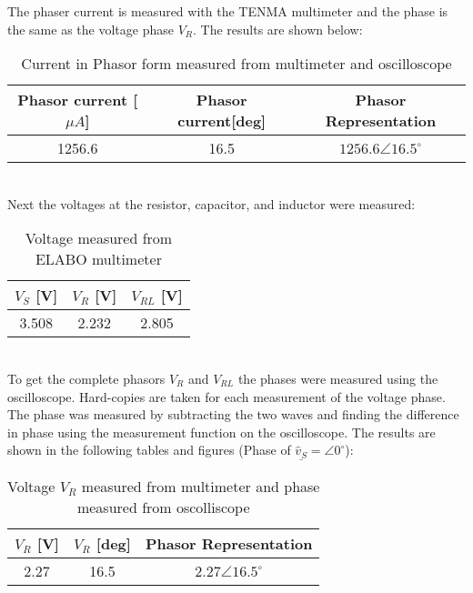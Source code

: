 \documentclass[12pt]{report}
\begin{document}
\FloatBarrier %
The phaser current is measured with the TENMA multimeter and the phase is the same as the voltage phase $V_R$. The results are shown below:
\begin{table}[ht]
\centering
\begin{minipage}{0.8\linewidth}
\centering
\begin{tabular}{|c|c|c|}
\hline
\rowcolor{lightblue} Phasor current [$\mu A$] & Phasor current[deg] & Phasor Representation \\
\hline
1256.6 & 16.5 & $ 1256.6 \angle 16.5^\circ $  \\
\hline
\end{tabular}
\caption{Current in Phasor form measured from multimeter and oscilloscope}
\label{tab:example}
\end{minipage}
\end{table}\\
Next the voltages at the resistor, capacitor, and inductor were measured: 
\begin{table}[ht]
\centering
\begin{minipage}{0.8\linewidth}
\centering
\begin{tabular}{|c|c|c|}
\hline
\rowcolor{lightblue} $V_S $ [V] & $V_R $ [V] & $V_{RL}$  [V]\\
\hline
3.508 & 2.232 & 2.805 \\
\hline
\end{tabular}
\caption{Voltage measured from ELABO multimeter}
\label{tab:example}
\end{minipage}
\end{table}
\\
To get the complete phasors $V_R $ and $V_{RL} $ the phases were measured using the oscilloscope. Hard-copies are taken for each measurement of the voltage phase. The phase was measured by subtracting the two waves and finding the difference in phase using the measurement function on the oscilloscope. The results are shown in the following tables and figures (Phase of $\underline{\hat{v}_{S}} = \angle 0^\circ$):
\begin{table}[!ht]
\centering
\begin{minipage}{0.8\linewidth}
\centering
\begin{tabular}{|c|c|c|}
\hline
\rowcolor{lightblue} $V_R $ [V] & $V_R $ [deg] & Phasor Representation\\
\hline
2.27 & 16.5 &  $ 2.27 \angle 16.5^\circ $ \\
\hline
\end{tabular}
\caption{Voltage $V_R$ measured from multimeter and phase measured from oscolliscope}
\label{tab:example}
\end{minipage}
\end{table}
\end{document}
